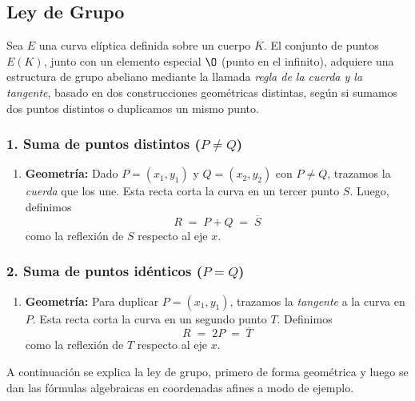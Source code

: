 \subsection{Ley de Grupo}\label{sec:ley_de_grupo}
Sea \(E\) una curva elíptica definida sobre un cuerpo \(K\). El conjunto de puntos \(E(K)\), junto con un elemento especial \(\O\) (punto en el infinito), adquiere una estructura de grupo abeliano mediante la llamada \emph{regla de la cuerda y la tangente}, basado en dos construcciones geométricas distintas, según si sumamos dos puntos distintos o duplicamos un mismo punto.

\subsubsection*{1. Suma de puntos distintos (\(P \neq Q\))}

\begin{enumerate}
  \item {\bf Geometría:} Dado \(P=(x_1,y_1)\) y \(Q=(x_2,y_2)\) con \(P\neq Q\), trazamos la \emph{cuerda} que los une. Esta recta corta la curva en un tercer punto \(S\). Luego, definimos
  \[
    R \;=\; P + Q
    \;=\; \overline{S}
  \]
  como la reflexión de \(S\) respecto al eje \(x\).  
\end{enumerate}

\subsubsection*{2. Suma de puntos idénticos (\(P = Q\))}

\begin{enumerate}
  \item {\bf Geometría:} Para duplicar \(P=(x_1,y_1)\), trazamos la \emph{tangente} a la curva en \(P\). Esta recta corta la curva en un segundo punto \(T\). Definimos
  \[
    R \;=\; 2P
    \;=\; \overline{T}
  \]
  como la reflexión de \(T\) respecto al eje \(x\).  
\end{enumerate}

A continuación se explica la ley de grupo, primero de forma geométrica y luego se dan las fórmulas algebraicas en coordenadas afines a modo de ejemplo.

